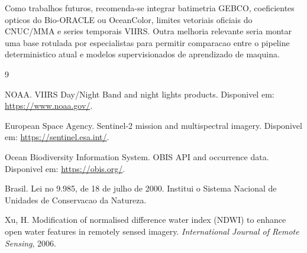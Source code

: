 \documentclass[12pt]{article}
\begin{document}
Como trabalhos futuros, recomenda-se integrar batimetria GEBCO, coeficientes opticos do Bio-ORACLE ou OceanColor, limites vetoriais oficiais do CNUC/MMA e series temporais VIIRS. Outra melhoria relevante seria montar uma base rotulada por especialistas para permitir comparacao entre o pipeline deterministico atual e modelos supervisionados de aprendizado de maquina.

\begin{thebibliography}{9}

NOAA. VIIRS Day/Night Band and night lights products. Disponivel em: \url{https://www.noaa.gov/}.

European Space Agency. Sentinel-2 mission and multispectral imagery. Disponivel em: \url{https://sentinel.esa.int/}.

Ocean Biodiversity Information System. OBIS API and occurrence data. Disponivel em: \url{https://obis.org/}.

Brasil. Lei no 9.985, de 18 de julho de 2000. Institui o Sistema Nacional de Unidades de Conservacao da Natureza.

Xu, H. Modification of normalised difference water index (NDWI) to enhance open water features in remotely sensed imagery. \emph{International Journal of Remote Sensing}, 2006.

\end{thebibliography}
\end{document}
